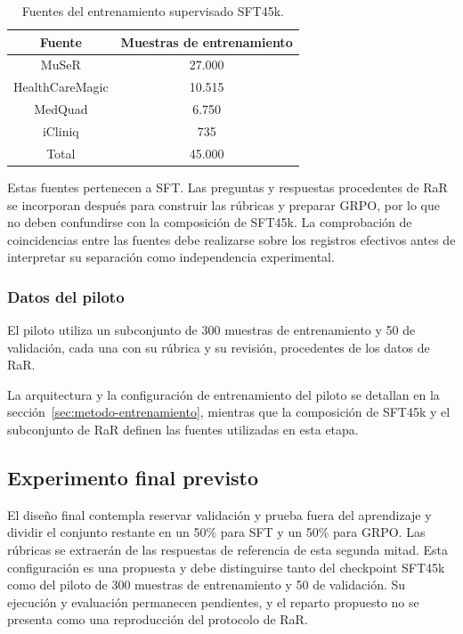 \begin{table}[htbp]
\centering
\caption{Fuentes del entrenamiento supervisado SFT45k.}
\label{tab:sft45k-fuentes}
\begin{tabular}{cc}
\toprule
Fuente & Muestras de entrenamiento \\
\midrule
MuSeR & 27.000 \\
HealthCareMagic & 10.515 \\
MedQuad & 6.750 \\
iCliniq & 735 \\
\midrule
Total & 45.000 \\
\bottomrule
\end{tabular}
\end{table}

Estas fuentes pertenecen a SFT. Las preguntas y respuestas procedentes de RaR se incorporan después para construir las rúbricas y preparar GRPO, por lo que no deben confundirse con la composición de SFT45k. La comprobación de coincidencias entre las fuentes debe realizarse sobre los registros efectivos antes de interpretar su separación como independencia experimental.

\subsubsection{Datos del piloto}
El piloto utiliza un subconjunto de 300 muestras de entrenamiento y 50 de validación, cada una con su rúbrica y su revisión, procedentes de los datos de RaR.

La arquitectura y la configuración de entrenamiento del piloto se detallan en la sección~\ref{sec:metodo-entrenamiento}, mientras que la composición de SFT45k y el subconjunto de RaR definen las fuentes utilizadas en esta etapa.


\subsection{Experimento final previsto}
\label{sec:protocolo-final-previsto}
El diseño final contempla reservar validación y prueba fuera del aprendizaje y dividir el conjunto restante en un 50\% para SFT y un 50\% para GRPO. Las rúbricas se extraerán de las respuestas de referencia de esta segunda mitad. Esta configuración es una propuesta y debe distinguirse tanto del checkpoint SFT45k como del piloto de 300 muestras de entrenamiento y 50 de validación. Su ejecución y evaluación permanecen pendientes, y el reparto propuesto no se presenta como una reproducción del protocolo de RaR.
